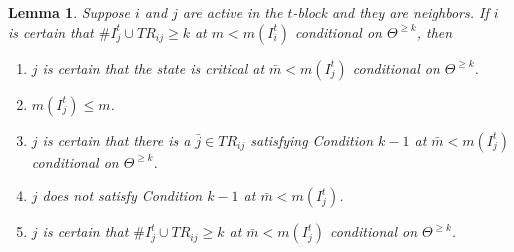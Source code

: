 \documentclass[12pt,letter]{article}
\newtheorem{lemma}{Lemma}[section]
\theoremstyle{definition}
\theoremstyle{definition}
\theoremstyle{remark}
\theoremstyle{claim}
\begin{document}
\begin{lemma} Suppose $i$ and $j$ are active in the $t$-block and they are neighbors. If $i$ is certain that $\#I^{t}_j\cup TR_{ij}\geq k$ at $m<m(I^t_i)$ conditional on $\Theta^{\geq k}$, then
\begin{enumerate}
\item $j$ is certain that the state is critical at $\bar{m}<m(I^t_j)$ conditional on $\Theta^{\geq k}$.
\item $m(I^t_j)\leq m$.
\item $j$ is certain that there is a $\bar{j}\in TR_{ij}$ satisfying Condition $k-1$ at $\bar{m}<m(I^t_j)$ conditional on $\Theta^{\geq k}$.
\item $j$ does not satisfy Condition $k-1$ at $\bar{m}<m(I^t_j)$.
\item $j$ is certain that $\#I^{t}_j\cup TR_{ij}\geq k$ at $\bar{m}<m(I^t_j)$ conditional on $\Theta^{\geq k}$.
\end{enumerate}
\end{lemma}
\end{document}
